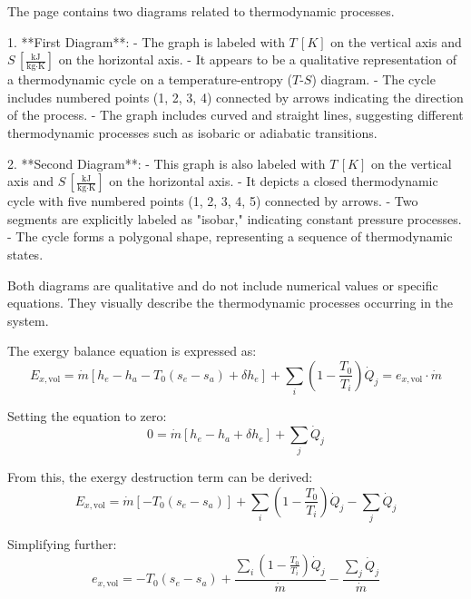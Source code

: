 The page contains two diagrams related to thermodynamic processes.

1. **First Diagram**:  
   - The graph is labeled with \( T \, [K] \) on the vertical axis and \( S \, [\frac{\text{kJ}}{\text{kg·K}}] \) on the horizontal axis.  
   - It appears to be a qualitative representation of a thermodynamic cycle on a temperature-entropy (\( T \)-\( S \)) diagram.  
   - The cycle includes numbered points (1, 2, 3, 4) connected by arrows indicating the direction of the process.  
   - The graph includes curved and straight lines, suggesting different thermodynamic processes such as isobaric or adiabatic transitions.  

2. **Second Diagram**:  
   - This graph is also labeled with \( T \, [K] \) on the vertical axis and \( S \, [\frac{\text{kJ}}{\text{kg·K}}] \) on the horizontal axis.  
   - It depicts a closed thermodynamic cycle with five numbered points (1, 2, 3, 4, 5) connected by arrows.  
   - Two segments are explicitly labeled as "isobar," indicating constant pressure processes.  
   - The cycle forms a polygonal shape, representing a sequence of thermodynamic states.  

Both diagrams are qualitative and do not include numerical values or specific equations. They visually describe the thermodynamic processes occurring in the system.

The exergy balance equation is expressed as:  
\[
E_{x,\text{vol}} = \dot{m} \left[ h_e - h_a - T_0 (s_e - s_a) + \delta h_e \right] + \sum_i \left( 1 - \frac{T_0}{T_i} \right) \dot{Q}_j = e_{x,\text{vol}} \cdot \dot{m}
\]

Setting the equation to zero:  
\[
0 = \dot{m} \left[ h_e - h_a + \delta h_e \right] + \sum_j \dot{Q}_j
\]

From this, the exergy destruction term can be derived:  
\[
E_{x,\text{vol}} = \dot{m} \left[ -T_0 (s_e - s_a) \right] + \sum_i \left( 1 - \frac{T_0}{T_i} \right) \dot{Q}_j - \sum_j \dot{Q}_j
\]

Simplifying further:  
\[
e_{x,\text{vol}} = -T_0 (s_e - s_a) + \frac{\sum_i \left( 1 - \frac{T_0}{T_i} \right) \dot{Q}_j}{\dot{m}} - \frac{\sum_j \dot{Q}_j}{\dot{m}}
\]